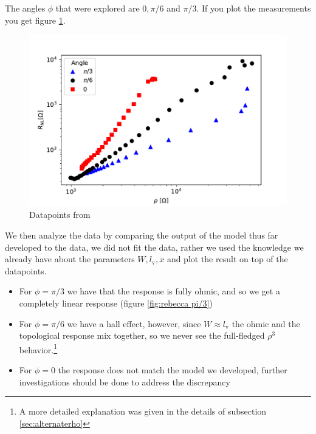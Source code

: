 The angles $\phi$ that were explored are $0,\pi/6$ and $\pi/3$. If you plot the measurements you get figure \ref{fig:rebeccadatapoints}.\\
\begin{figure}[h!]
    \centering
    \includegraphics[width=\linewidth]{Immagini/rnl/rebecca_data.pdf}
    \caption{Datapoints from \cite{rebecca2022moirè}}
    \label{fig:rebeccadatapoints}
\end{figure}
We then analyze the data by comparing the output of the model thus far developed to the data, we did not fit the data, rather we used the knowledge we already have about the parameters $W,l_\textrm{v},x$ and plot the result on top of the datapoints.
\begin{itemize}
    \item For $\phi=\pi/3$ we have that the response is fully ohmic, and so we get a completely linear response (figure \ref{fig:rebecca pi/3})
    \item For $\phi=\pi/6$ we have a hall effect, however, since $W\approx l_\textrm{v}$ the ohmic and the topological response mix together, so we never see the full-fledged $\rho^3$ behavior.\footnote{A more detailed explanation was given in the details of subsection \ref{sec:alternaterho}}
    \item For $\phi=0$ the response does not match the model we developed, further investigations should be done to address the discrepancy
\end{itemize}
